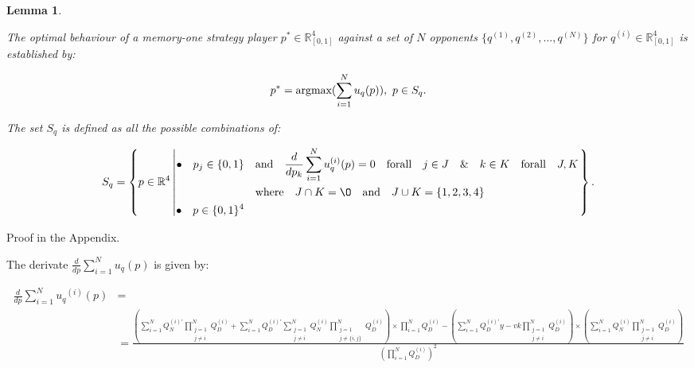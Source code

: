 \documentclass[10pt]{article}
\newcommand{\R}{\mathbb{R}}
\newtheorem{lemma}[theorem]{Lemma}
\begin{document}
\begin{lemma}\label{lemma:memone_group_best_response}

    The optimal behaviour of a memory-one strategy player
    \(p^* \in \R_{[0, 1]} ^ 4\)
    against a set of \(N\) opponents \(\{q^{(1)}, q^{(2)}, \dots, q^{(N)} \}\)
    for \(q^{(i)} \in \R_{[0, 1]} ^ 4\) is established by:

    \[p^* = \textnormal{argmax}(\sum\limits_{i=1} ^ N  u_q(p)), \ p \in S_q.\]

    The set \(S_q\) is defined as all the possible combinations of:

    \[
        S_q =
        \left\{p \in \mathbb{R} ^ 4 \left|
            \begin{aligned}
                \bullet\quad p_j \in \{0, 1\} & \quad \text{and} \quad \frac{d}{dp_k} 
                \sum\limits_{i=1} ^ N  u_q^{(i)}(p) = 0
                \quad \text{forall} \quad j \in J \quad \&  \quad k \in K  \quad \text{forall} \quad J, K \\
                & \quad \text{where} \quad J \cap K = \O \quad
                \text{and} \quad J \cup K = \{1, 2, 3, 4\}\\
                \bullet\quad  p \in \{0, 1\} ^ 4
            \end{aligned}\right.
        \right\}.
    \]
\end{lemma}

Proof in the Appendix.

The derivate \(\frac{d}{dp} \sum\limits_{i=1} ^ N  u_q(p)\) is given by:

{\scriptsize
\begin{align}\label{eq:mo_tournament_derivative}
    \frac{d}{dp} \sum\limits_{i=1} ^ {N} {u_q}^{(i)} (p) & = \nonumber \\
    & =\frac{
    (\sum\limits_{i=1} ^ {N} Q_{N}^{(i)'} \prod_{\substack{j=1 \\ j \neq i}} ^ N Q_{D}^{(i)}
    + \sum\limits_{i=1} ^ {N} Q_{D}^{(i)'} \sum_{\substack{j=1 \\ j \neq i}} ^ {N} Q_{N}^{(i)}
   \prod_{\substack{j=1 \\ j \neq \{i, j\}}} ^ N Q_{D}^{(i)}) \times
   \prod\limits_{i=1} ^ N Q_{D}^{(i)} - (\sum\limits_{i=1} ^ {N} Q_{D}^{(i)'}y-vk
   \prod_{\substack{j=1 \\ j \neq i}} ^ N Q_{D}^{(i)}) \times
   (\sum\limits_{i=1} ^ {N} Q_{N}^{(i)} \prod_{\substack{j=1 \\ j \neq i}} ^ N Q_{D}^{(i)})}
    {(\prod\limits_{i=1} ^ N Q_{D}^{(i)})^{2}}
\end{align}
}
\end{document}
